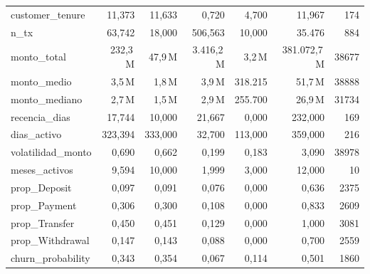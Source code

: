 \begin{table}[htbp]
\begin{tabular}{lrrrrrr}
customer\_tenure & 11,373 & 11,633 & 0,720 & 4,700 & 11,967 & 174 \\
n\_tx & 63,742 & 18,000 & 506,563 & 10,000 & 35.476 & 884 \\
monto\_total & 232,3\,M & 47,9\,M & 3.416,2\,M & 3,2\,M & 381.072,7\,M & 38677 \\
monto\_medio & 3,5\,M & 1,8\,M & 3,9\,M & 318.215 & 51,7\,M & 38888 \\
monto\_mediano & 2,7\,M & 1,5\,M & 2,9\,M & 255.700 & 26,9\,M & 31734 \\
recencia\_dias & 17,744 & 10,000 & 21,667 & 0,000 & 232,000 & 169 \\
dias\_activo & 323,394 & 333,000 & 32,700 & 113,000 & 359,000 & 216 \\
volatilidad\_monto & 0,690 & 0,662 & 0,199 & 0,183 & 3,090 & 38978 \\
meses\_activos & 9,594 & 10,000 & 1,999 & 3,000 & 12,000 & 10 \\
prop\_Deposit & 0,097 & 0,091 & 0,076 & 0,000 & 0,636 & 2375 \\
prop\_Payment & 0,306 & 0,300 & 0,108 & 0,000 & 0,833 & 2609 \\
prop\_Transfer & 0,450 & 0,451 & 0,129 & 0,000 & 1,000 & 3081 \\
prop\_Withdrawal & 0,147 & 0,143 & 0,088 & 0,000 & 0,700 & 2559 \\
churn\_probability & 0,343 & 0,354 & 0,067 & 0,114 & 0,501 & 1860 \\
\bottomrule
\end{tabular}
\end{table}
